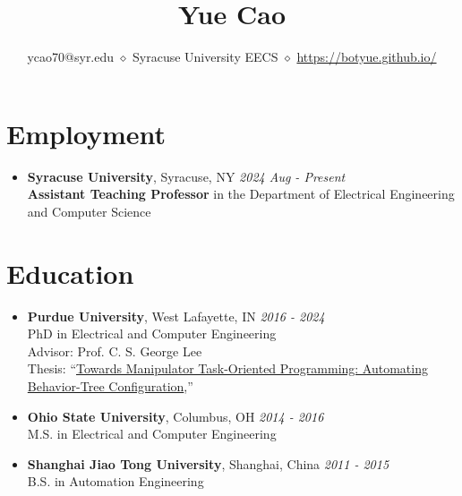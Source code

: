 \documentclass[12pt]{article}
\title{\textbf{Yue Cao}}
\date{\normalsize ycao70@syr.edu  \enspace $\diamond$ \enspace Syracuse University EECS \enspace $\diamond$ \enspace \url{https://botyue.github.io/}}
\begin{document}
\maketitle
{}
\vspace{0.1cm}


\section*{Employment}
\begin{itemize}[leftmargin=1.5em]
\item[] {\bf Syracuse University}, Syracuse, NY \hfill {\em 2024 Aug - Present} 
\\ \textbf{Assistant Teaching Professor} in the Department of Electrical Engineering and Computer Science
\end{itemize}

\section*{Education}
\begin{itemize}[leftmargin=1.5em]
\item[] {\bf Purdue University}, West Lafayette, IN \hfill {\em 2016 - 2024} 
\\ PhD in Electrical and Computer Engineering 
\\ Advisor: Prof. C. S. George Lee
\\ Thesis: ``\href{https://hammer.purdue.edu/articles/thesis/Towards_Manipulator_Task-Oriented_Programming_Automating_Behavior-Tree_Configuration/26198237?file=47476343}{Towards Manipulator Task-Oriented Programming: Automating Behavior-Tree Configuration},''
 
\item[] {\bf Ohio State University}, Columbus, OH \hfill {\em 2014 - 2016} 
\\ M.S. in Electrical and Computer Engineering

\item[] {\bf Shanghai Jiao Tong University}, Shanghai, China \hfill {\em 2011 - 2015} 
\\ B.S. in Automation Engineering
\end{itemize}
\end{document}
